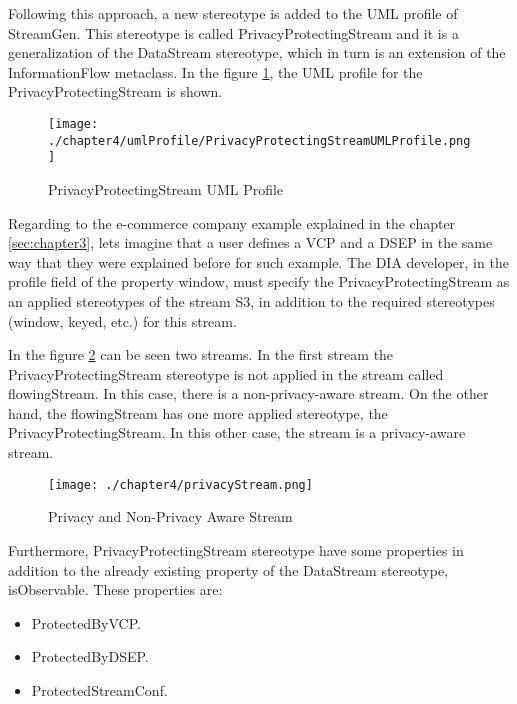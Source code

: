 Following this approach, a new stereotype is added to the UML profile of StreamGen. This stereotype is called PrivacyProtectingStream and it is a generalization of the DataStream stereotype, which in turn is an extension of the InformationFlow metaclass. In the figure \ref{fig:PrivacyProtectingStream UML Profile}, the UML profile for the PrivacyProtectingStream is shown.

\begin{figure}
\centering
{\texttt{[image: ./chapter4/umlProfile/PrivacyProtectingStreamUMLProfile.png]}}
\caption{PrivacyProtectingStream UML Profile}
\label{fig:PrivacyProtectingStream UML Profile}
\end{figure}

Regarding to the e-commerce company example explained in the chapter \ref{sec:chapter3}, lets imagine that a user defines a VCP and a DSEP in the same way that they were explained before for such example. The DIA developer, in the profile field of the property window, must specify the PrivacyProtectingStream as an applied stereotypes of the stream S3, in addition to the required stereotypes (window, keyed, etc.) for this stream.

In the figure \ref{fig:Privacy and Non-Privacy Aware Stream} can be seen two streams. In the first stream the PrivacyProtectingStream stereotype is not applied in the stream called flowingStream. In this case, there is a non-privacy-aware stream. On the other hand, the flowingStream has one more applied stereotype, the PrivacyProtectingStream. In this other case, the stream is a privacy-aware stream.

\begin{figure}
\centering
{\texttt{[image: ./chapter4/privacyStream.png]}}
\caption{Privacy and Non-Privacy Aware Stream}
\label{fig:Privacy and Non-Privacy Aware Stream}
\end{figure}

Furthermore, PrivacyProtectingStream stereotype have some properties in addition to the already existing property of the DataStream stereotype, isObservable. These properties are:

\begin{itemize}
\item ProtectedByVCP.
\item ProtectedByDSEP.
\item ProtectedStreamConf.
\end{itemize}

